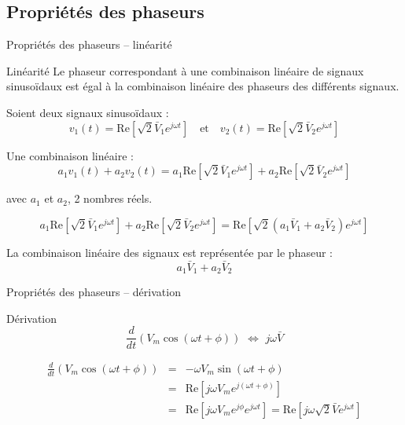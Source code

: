 \subsection{Propriétés des phaseurs}
\begin{frame}[allowframebreaks]{Propriétés des phaseurs -- linéarité}
	
	\begin{block}{Linéarité}
	Le phaseur correspondant à une combinaison linéaire de signaux sinusoïdaux est égal à la combinaison linéaire des phaseurs des différents signaux.
	\end{block}
	
	Soient deux signaux sinusoïdaux :
	\[v_1(t)=\text{Re}[\sqrt{2}\bar{V}_1e^{j\omega t}] \quad \text{et}
	\quad v_2(t)=\text{Re}[\sqrt{2}\bar{V}_2e^{j\omega t}]\]
	
	Une combinaison linéaire :
	\[a_1v_1(t)+a_2v_2(t)=
	a_1\text{Re}[\sqrt{2}\bar{V}_1e^{j\omega t}] +
	a_2\text{Re}[\sqrt{2}\bar{V}_2e^{j\omega t}]\]
	
	avec $a_1$ et $a_2$, 2 nombres réels.
	
	\[a_1\text{Re}[\sqrt{2}\bar{V}_1e^{j\omega t}] +
	a_2\text{Re}[\sqrt{2}\bar{V}_2e^{j\omega t}] =
	\text{Re}[\sqrt{2}(a_1\bar{V}_1+a_2\bar{V}_2)e^{j\omega t}]\]
	
	La combinaison linéaire des signaux est représentée par le phaseur :
	\[a_1\bar{V}_1+a_2\bar{V}_2\]
\end{frame}


\begin{frame}{Propriétés des phaseurs -- dérivation}
	
	\begin{block}{Dérivation}
	\[\frac{d}{dt}\left(V_m\cos(\omega t+\phi)\right)\,\,\Leftrightarrow\,\,
	j\omega \bar{V}\]
	\end{block}
	
	\begin{eqnarray*}
		\frac{d}{dt}\left(V_m\cos(\omega t+\phi)\right)& = &
		-\omega V_m\sin(\omega t+\phi) \\
		& = &\text{Re}[j\omega V_me^{j(\omega t + \phi)}]\\
		& = &\text{Re}[j\omega V_me^{j\phi}e^{j\omega t}]= \text{Re}[j\omega \sqrt{2}\bar{V}e^{j\omega t}]
	\end{eqnarray*}
	\begin{center}
	\end{center}
	
\end{frame}

